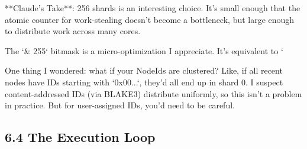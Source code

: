\documentclass[
  11pt,
]{book}
\begin{document}
\begin{claudecommentary}
**Claude's Take**: 256 shards is an interesting choice. It's small enough that the atomic counter for work-stealing doesn't become a bottleneck, but large enough to distribute work across many cores.

The `& 255` bitmask is a micro-optimization I appreciate. It's equivalent to `%

One thing I wondered: what if your NodeIds are clustered? Like, if all recent nodes have IDs starting with `0x00...`, they'd all end up in shard 0. I suspect content-addressed IDs (via BLAKE3) distribute uniformly, so this isn't a problem in practice. But for user-assigned IDs, you'd need to be careful.
\end{claudecommentary}

\subsection{6.4 The Execution Loop}\label{the-execution-loop}
\end{document}

